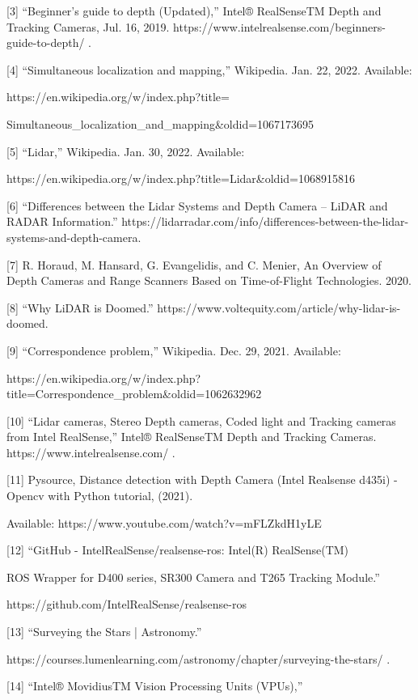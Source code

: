 \documentclass{article}
\begin{document}
[3]	“Beginner’s guide to depth (Updated),” Intel® RealSenseTM Depth and Tracking Cameras, Jul. 16, 2019. https://www.intelrealsense.com/beginners-guide-to-depth/ .
\bigskip

[4]	“Simultaneous localization and mapping,” Wikipedia. Jan. 22, 2022. Available:

https://en.wikipedia.org/w/index.php?title=

Simultaneous\_localization\_and\_mapping\&oldid=1067173695
\bigskip

[5]	“Lidar,” Wikipedia. Jan. 30, 2022. Available:

https://en.wikipedia.org/w/index.php?title=Lidar\&oldid=1068915816
\bigskip

[6]	“Differences between the Lidar Systems and Depth Camera – LiDAR and RADAR Information.” https://lidarradar.com/info/differences-between-the-lidar-systems-and-depth-camera.
\bigskip

[7]	R. Horaud, M. Hansard, G. Evangelidis, and C. Menier, An Overview of Depth Cameras and Range Scanners Based on Time-of-Flight Technologies. 2020.
\bigskip

[8]	“Why LiDAR is Doomed.” https://www.voltequity.com/article/why-lidar-is-doomed.
\bigskip

[9]	“Correspondence problem,” Wikipedia. Dec. 29, 2021. Available:

https://en.wikipedia.org/w/index.php?title=Correspondence\_problem\&oldid=1062632962
\bigskip

[10]	“Lidar cameras, Stereo Depth cameras, Coded light and Tracking cameras from Intel RealSense,” Intel® RealSenseTM Depth and Tracking Cameras. https://www.intelrealsense.com/ .
\bigskip

[11]	Pysource, Distance detection with Depth Camera (Intel Realsense d435i) - Opencv with Python tutorial, (2021). 

Available: https://www.youtube.com/watch?v=mFLZkdH1yLE
\bigskip

[12]	“GitHub - IntelRealSense/realsense-ros: Intel(R) RealSense(TM) 

ROS Wrapper for D400 series, SR300 Camera and T265 Tracking Module.”

https://github.com/IntelRealSense/realsense-ros 
\bigskip

[13]	“Surveying the Stars | Astronomy.”

https://courses.lumenlearning.com/astronomy/chapter/surveying-the-stars/ .
\bigskip

[14]	“Intel® MovidiusTM Vision Processing Units (VPUs),” 
\end{document}
